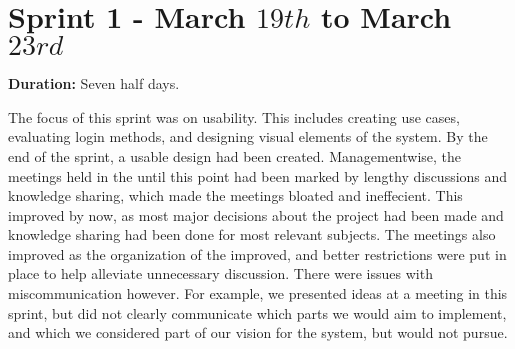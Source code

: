 \section{Sprint 1 - March $19th$ to March $23rd$}

\textbf{Duration:} Seven half days. \newline

The focus of this sprint was on usability. 
This includes creating use cases, evaluating login methods, and designing visual elements of the system. 
By the end of the sprint, a usable design had been created. \newline
Managementwise, the meetings held in the \globalgroup{} until this point had been marked by lengthy discussions and knowledge sharing, which made the meetings bloated and ineffecient. 
This improved by now, as most major decisions about the project had been made and knowledge sharing had been done for most relevant subjects. 
The meetings also improved as the organization of the \globalgroup{} improved, and better restrictions were put in place to help alleviate unnecessary discussion. \newline
There were issues with miscommunication however. 
For example, we presented ideas at a meeting in this sprint, but did not clearly communicate which parts we would aim to implement, and which we considered part of our vision for the system, but would not pursue. 
